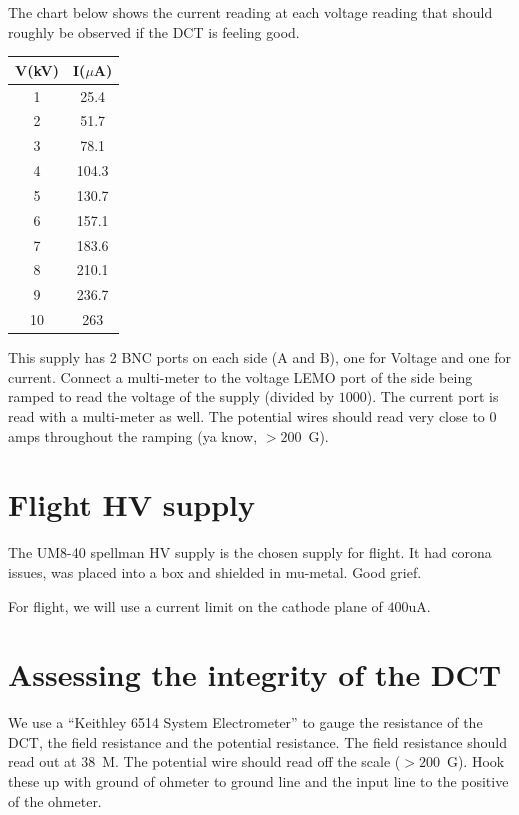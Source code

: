 \documentclass[12pt]{article}
\begin{document}

The chart below shows the current reading at each voltage reading that should roughly be observed if the DCT is feeling good. 

\begin{tabular}{|c|c|} \hline
    V(kV) & I($\mu$A) \\\hline
    1 & 25.4 \\
    2 & 51.7 \\
    3 & 78.1 \\
    4 & 104.3 \\
    5 & 130.7 \\
    6 & 157.1 \\
    7 & 183.6 \\
    8 & 210.1 \\
    9 & 236.7 \\
    10 & 263 \\\hline
\end{tabular}

This supply has 2 BNC ports on each side (A and B), one for Voltage and one for current. Connect a multi-meter to the voltage LEMO port of the side being ramped to read the voltage of the supply (divided by $1000$). The current port is read with a multi-meter as well. The potential wires should read very close to 0 amps throughout the ramping (ya know, $>200$~G\ohm). %

\section{Flight HV supply}
The UM8-40 spellman HV supply is the chosen supply for flight. It had corona issues, was placed into a box and shielded in mu-metal. Good grief. 

For flight, we will use a current limit on the cathode plane of $400$uA. 

\section{Assessing the integrity of the DCT}
We use a ``Keithley 6514 System Electrometer'' to gauge the resistance of the DCT, the field resistance and the potential resistance. The field resistance should read out at $38$~M\ohm. The potential wire should read off the scale ($>200$~G\ohm). Hook these up with ground of ohmeter to ground line and the input line to the positive of the ohmeter. %
\end{document}
